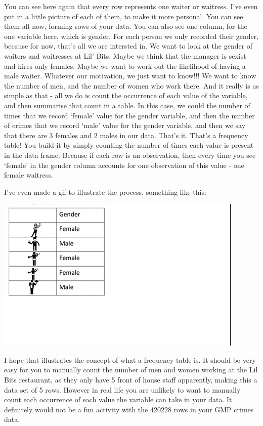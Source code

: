 \documentclass[]{book}
\theoremstyle{definition}
\theoremstyle{definition}
\theoremstyle{definition}
\theoremstyle{remark}
\begin{document}
You can see here again that every row represents one waiter or waitress.
I've even put in a little picture of each of them, to make it more
personal. You can see them all now, forming rows of your data. You can
also see one column, for the one variable here, which is gender. For
each person we only recorded their gender, because for now, that's all
we are intersted in. We want to look at the gender of waiters and
waitresses at Lil' Bits. Maybe we think that the manager is sexist and
hires only females. Maybe we want to work out the likelihood of having a
male waiter. Whatever our motivation, we just want to know!!! We want to
know the number of men, and the number of women who work there. And it
really is as simple as that - all we do is count the occurrence of each
value of the variable, and then summarise that count in a table. In this
case, we could the number of times that we record `female' value for the
gender variable, and then the number of crimes that we record `male'
value for the gender variable, and then we say that there are 3 females
and 2 males in our data. That's it. That's a frequency table! You build
it by simply counting the number of times each value is present in the
data frame. Because if each row is an observation, then every time you
see `female' in the gender column accounts for one observation of this
value - one female waitress.

I've even made a gif to illustrate the process, something like this:

\includegraphics{imgs/freq_table_gif.gif}

I hope that illustrates the concept of what a frequency table is. It
should be very easy for you to manually count the number of men and
women working at the Lil Bits restaurant, as they only have 5 front of
house staff apparently, making this a data set of 5 rows. However in
real life you are unlikely to want to manually count each occurrence of
each value the variable can take in your data. It definitely would not
be a fun activity with the 420228 rows in your GMP crimes data.
\end{document}
